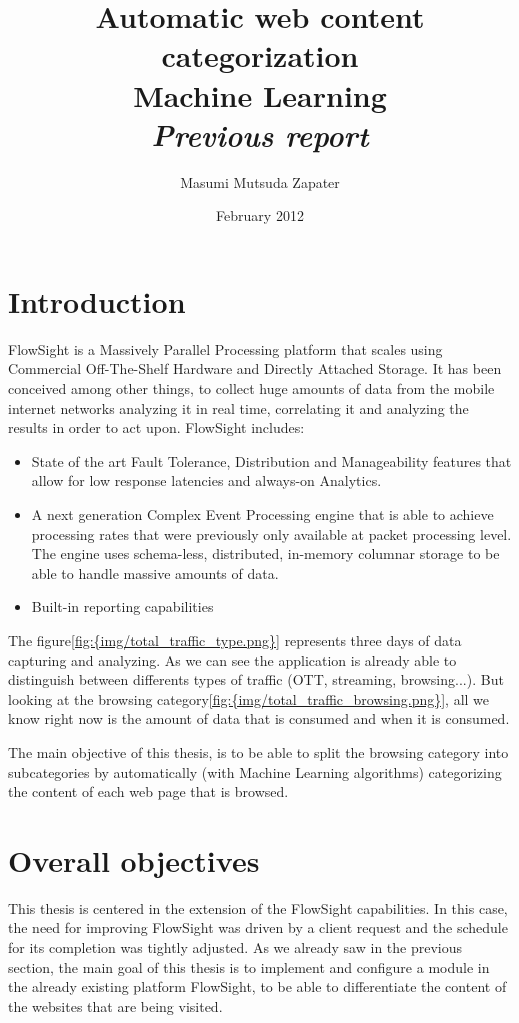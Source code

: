 \documentclass[12pt, a4paper , titlepage]{report}
\author{Masumi Mutsuda Zapater}
\title{Automatic web content categorization \\ Machine Learning \\ \large{\textit{Previous report}}}
\date{February 2012}
\begin{document}
\maketitle

\tableofcontents

\chapter{Introduction}
FlowSight is a Massively Parallel Processing platform that scales using Commercial Off-The-Shelf Hardware and Directly Attached Storage. It has been conceived among other things, to collect
huge amounts of data from the mobile internet networks analyzing it in real time, correlating it and analyzing the results in order to act upon. FlowSight includes:
\begin{itemize}
  \item{State of the art Fault Tolerance, Distribution and Manageability features that allow for low response latencies and always-on Analytics.}
  \item{A next generation Complex Event Processing engine that is able to achieve processing rates that were previously only available at packet processing level. The engine uses schema-less, 
        distributed, in-memory columnar storage to be able to handle massive amounts of data.}
  \item{Built-in reporting capabilities}
\end{itemize}
The figure\ref{fig:{img/total_traffic_type.png}} represents three days of data capturing and analyzing. As we can see the application is already able to distinguish between differents types of traffic (OTT, streaming, browsing...).
But looking at the browsing category\ref{fig:{img/total_traffic_browsing.png}}, all we know right now is the amount of data that is consumed and when it is consumed.



The main objective of this thesis, is to be able to split the browsing category into subcategories by automatically (with Machine Learning algorithms) categorizing the content of each web page that is browsed. 


\chapter{Overall objectives}
This thesis is centered in the extension of the FlowSight capabilities. In this case, the need for improving FlowSight was driven by a client request and the schedule for its completion was tightly
adjusted. As we already saw in the previous section, the main goal of this thesis is to implement and configure a module in the already existing platform FlowSight, to be able to differentiate
the content of the websites that are being visited.\\
 
\end{document}
